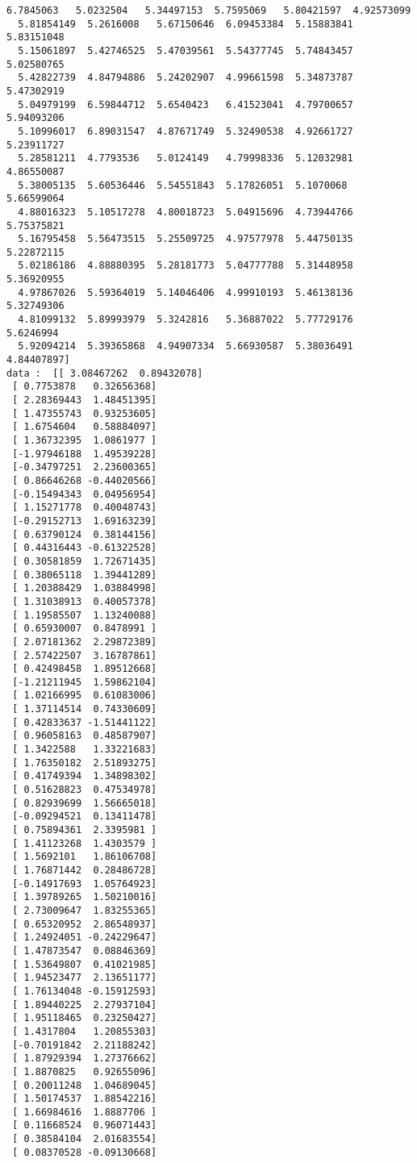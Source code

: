 \documentclass[11pt]{article}
\begin{document}
\begin{Verbatim}[commandchars=\\\{\}]
  6.7845063   5.0232504   5.34497153  5.7595069   5.80421597  4.92573099
  5.81854149  5.2616008   5.67150646  6.09453384  5.15883841  5.83151048
  5.15061897  5.42746525  5.47039561  5.54377745  5.74843457  5.02580765
  5.42822739  4.84794886  5.24202907  4.99661598  5.34873787  5.47302919
  5.04979199  6.59844712  5.6540423   6.41523041  4.79700657  5.94093206
  5.10996017  6.89031547  4.87671749  5.32490538  4.92661727  5.23911727
  5.28581211  4.7793536   5.0124149   4.79998336  5.12032981  4.86550087
  5.38005135  5.60536446  5.54551843  5.17826051  5.1070068   5.66599064
  4.88016323  5.10517278  4.80018723  5.04915696  4.73944766  5.75375821
  5.16795458  5.56473515  5.25509725  4.97577978  5.44750135  5.22872115
  5.02186186  4.88880395  5.28181773  5.04777788  5.31448958  5.36920955
  4.97867026  5.59364019  5.14046406  4.99910193  5.46138136  5.32749306
  4.81099132  5.89993979  5.3242816   5.36887022  5.77729176  5.6246994
  5.92094214  5.39365868  4.94907334  5.66930587  5.38036491  4.84407897] 
data :  [[ 3.08467262  0.89432078]
 [ 0.7753878   0.32656368]
 [ 2.28369443  1.48451395]
 [ 1.47355743  0.93253605]
 [ 1.6754604   0.58884097]
 [ 1.36732395  1.0861977 ]
 [-1.97946188  1.49539228]
 [-0.34797251  2.23600365]
 [ 0.86646268 -0.44020566]
 [-0.15494343  0.04956954]
 [ 1.15271778  0.40048743]
 [-0.29152713  1.69163239]
 [ 0.63790124  0.38144156]
 [ 0.44316443 -0.61322528]
 [ 0.30581859  1.72671435]
 [ 0.38065118  1.39441289]
 [ 1.20388429  1.03884998]
 [ 1.31038913  0.40057378]
 [ 1.19585507  1.13240088]
 [ 0.65930007  0.8478991 ]
 [ 2.07181362  2.29872389]
 [ 2.57422507  3.16787861]
 [ 0.42498458  1.89512668]
 [-1.21211945  1.59862104]
 [ 1.02166995  0.61083006]
 [ 1.37114514  0.74330609]
 [ 0.42833637 -1.51441122]
 [ 0.96058163  0.48587907]
 [ 1.3422588   1.33221683]
 [ 1.76350182  2.51893275]
 [ 0.41749394  1.34898302]
 [ 0.51628823  0.47534978]
 [ 0.82939699  1.56665018]
 [-0.09294521  0.13411478]
 [ 0.75894361  2.3395981 ]
 [ 1.41123268  1.4303579 ]
 [ 1.5692101   1.86106708]
 [ 1.76871442  0.28486728]
 [-0.14917693  1.05764923]
 [ 1.39789265  1.50210016]
 [ 2.73009647  1.83255365]
 [ 0.65320952  2.86548937]
 [ 1.24924051 -0.24229647]
 [ 1.47873547  0.08846369]
 [ 1.53649807  0.41021985]
 [ 1.94523477  2.13651177]
 [ 1.76134048 -0.15912593]
 [ 1.89440225  2.27937104]
 [ 1.95118465  0.23250427]
 [ 1.4317804   1.20855303]
 [-0.70191842  2.21188242]
 [ 1.87929394  1.27376662]
 [ 1.8870825   0.92655096]
 [ 0.20011248  1.04689045]
 [ 1.50174537  1.88542216]
 [ 1.66984616  1.8887706 ]
 [ 0.11668524  0.96071443]
 [ 0.38584104  2.01683554]
 [ 0.08370528 -0.09130668]

\end{Verbatim}
\end{document}
